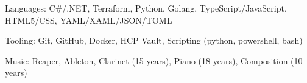 \documentclass[]{awesome-cv}
\begin{document}



\vspace{-2mm}
	\cventry
	{}
	{}
	{}
	{}
	{\begin{cvitems}
		\item {Languages: C\#/.NET, Terraform, Python, Golang, TypeScript/JavaScript, HTML5/CSS, YAML/XAML/JSON/TOML}
		\item {Tooling: Git, GitHub, Docker, HCP Vault, Scripting (python, powershell, bash)}
		\item {Music: Reaper, Ableton, Clarinet (15 years), Piano (18 years), Composition (10 years)}
	\end{cvitems}}
\end{document}
